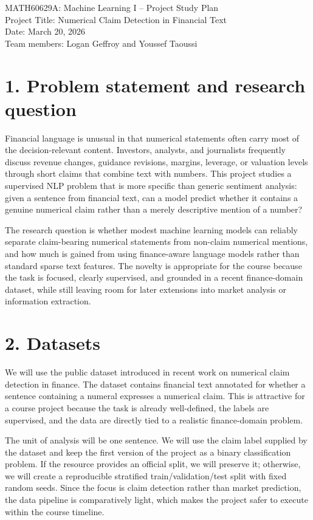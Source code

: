 \documentclass[11pt]{article}
\begin{document}
\begin{center}
{\Large MATH60629A: Machine Learning I -- Project Study Plan} \\
\vspace{0.5em}
{\large Project Title: Numerical Claim Detection in Financial Text} \\
\vspace{0.5em}
Date: March 20, 2026 \\
Team members: Logan Geffroy and Youssef Taoussi
\end{center}

\section*{1. Problem statement and research question}
Financial language is unusual in that numerical statements often carry most of the decision-relevant content. Investors, analysts, and journalists frequently discuss revenue changes, guidance revisions, margins, leverage, or valuation levels through short claims that combine text with numbers. This project studies a supervised NLP problem that is more specific than generic sentiment analysis: given a sentence from financial text, can a model predict whether it contains a genuine numerical claim rather than a merely descriptive mention of a number?

The research question is whether modest machine learning models can reliably separate claim-bearing numerical statements from non-claim numerical mentions, and how much is gained from using finance-aware language models rather than standard sparse text features. The novelty is appropriate for the course because the task is focused, clearly supervised, and grounded in a recent finance-domain dataset, while still leaving room for later extensions into market analysis or information extraction.

\section*{2. Datasets}
We will use the public dataset introduced in recent work on numerical claim detection in finance. The dataset contains financial text annotated for whether a sentence containing a numeral expresses a numerical claim. This is attractive for a course project because the task is already well-defined, the labels are supervised, and the data are directly tied to a realistic finance-domain problem.

The unit of analysis will be one sentence. We will use the claim label supplied by the dataset and keep the first version of the project as a binary classification problem. If the resource provides an official split, we will preserve it; otherwise, we will create a reproducible stratified train/validation/test split with fixed random seeds. Since the focus is claim detection rather than market prediction, the data pipeline is comparatively light, which makes the project safer to execute within the course timeline.
\end{document}
